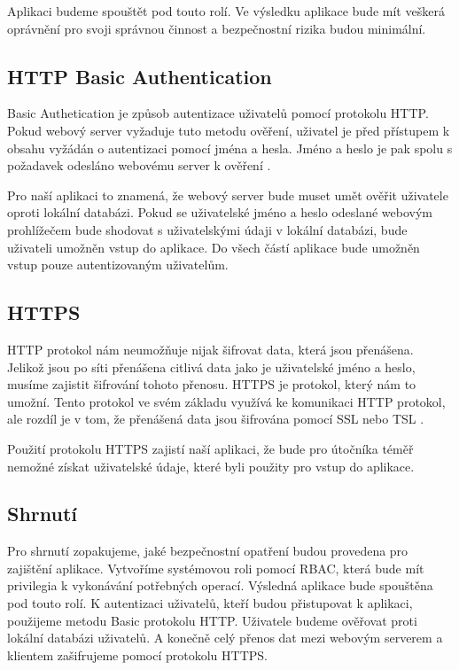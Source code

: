     Aplikaci budeme spouštět pod touto rolí. Ve výsledku aplikace bude mít veškerá oprávnění pro svoji správnou činnost a bezpečnostní rizika budou minimální.
    \subsection{HTTP Basic Authentication}
    \label{httpauth}
    Basic Authetication je způsob autentizace uživatelů pomocí protokolu HTTP. Pokud webový server vyžaduje tuto metodu ověření, uživatel je před přístupem k obsahu vyžádán o autentizaci pomocí jména a hesla. Jméno a heslo je pak spolu s požadavek odesláno webovému server k ověření \cite{RFC2617}.

    Pro naší aplikaci to znamená, že webový server bude muset umět ověřit uživatele oproti lokální databázi. Pokud se uživatelské jméno a heslo odeslané webovým prohlížečem bude shodovat s uživatelskými údaji v lokální databázi, bude uživateli umožněn vstup do aplikace. Do všech částí aplikace bude umožněn vstup pouze autentizovaným uživatelům.

    \subsection{HTTPS}
    \label{https}
    HTTP protokol nám neumožňuje nijak šifrovat data, která jsou přenášena. Jelikož jsou po síti přenášena citlivá data jako je uživatelské jméno a heslo, musíme zajistit šifrování tohoto přenosu. HTTPS je protokol, který nám to umožní. Tento protokol ve svém základu využívá ke komunikaci HTTP protokol, ale rozdíl je v tom, že přenášená data jsou šifrována pomocí SSL nebo TSL \cite{RFC2818}.

    Použití protokolu HTTPS zajistí naší aplikaci, že bude pro útočníka téměř nemožné získat uživatelské údaje, které byli použity pro vstup do aplikace.
    \subsection{Shrnutí}
    Pro shrnutí zopakujeme, jaké bezpečnostní opatření budou provedena pro zajištění aplikace. Vytvoříme systémovou roli pomocí RBAC, která bude mít privilegia k vykonávání potřebných operací. Výsledná aplikace bude spouštěna pod touto rolí. K autentizaci uživatelů, kteří budou přistupovat k aplikaci, použijeme metodu Basic protokolu HTTP. Uživatele budeme ověřovat proti lokální databázi uživatelů. A konečně celý přenos dat mezi webovým serverem a klientem zašifrujeme pomocí protokolu HTTPS.

